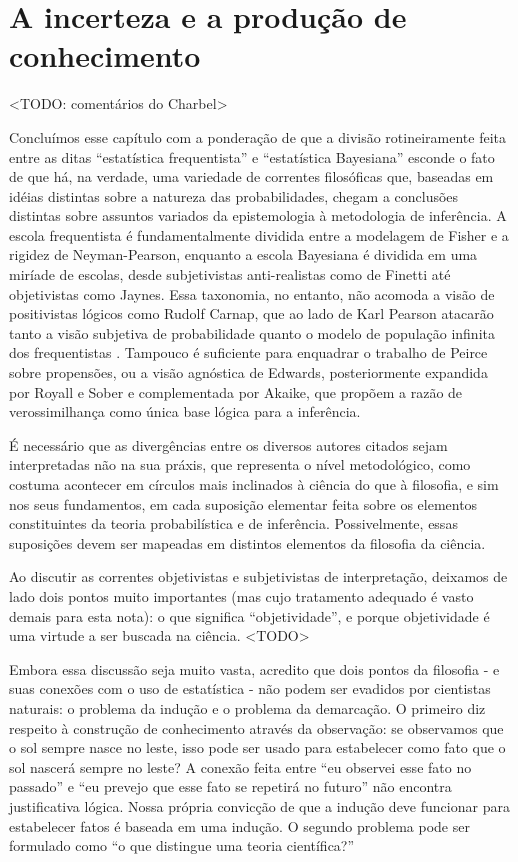 \section{A incerteza e a produção de conhecimento}\label{sec:ciencia} <TODO: comentários do Charbel>

Concluímos esse capítulo com a ponderação de que a divisão rotineiramente feita entre as ditas ``estatística
frequentista'' e 
``estatística Bayesiana'' esconde o fato de que há, na verdade, uma variedade de correntes filosóficas que, baseadas
em idéias distintas sobre a natureza das probabilidades, chegam a
conclusões distintas sobre assuntos variados da epistemologia 
à metodologia de inferência. A escola frequentista é fundamentalmente dividida entre a modelagem de Fisher e a
rigidez de
Neyman-Pearson, enquanto a escola Bayesiana é dividida em uma miríade de escolas, desde
subjetivistas anti-realistas como de Finetti até objetivistas como Jaynes.
Essa taxonomia, no entanto, não acomoda a visão de positivistas lógicos como Rudolf Carnap, que ao lado de Karl
Pearson atacarão tanto
a visão subjetiva de probabilidade quanto o modelo de população infinita dos frequentistas
\citep{Lenhard06, Zabell09}.
Tampouco é suficiente para enquadrar o trabalho de Peirce sobre propensões, ou a visão agnóstica de Edwards, 
posteriormente expandida por Royall e Sober e complementada por
Akaike, que propõem a razão de verossimilhança como única base lógica para a inferência.

É necessário que as divergências entre os diversos autores citados sejam interpretadas não na sua práxis, que
representa 
o nível metodológico, como costuma acontecer em círculos mais inclinados à ciência do que à filosofia, 
e sim nos seus fundamentos, em cada suposição elementar feita sobre os
elementos constituintes da teoria probabilística e de inferência. Possivelmente, essas suposições devem ser
mapeadas em
distintos elementos da filosofia da ciência.

Ao discutir as correntes objetivistas e subjetivistas de interpretação, deixamos de lado dois pontos muito
importantes (mas cujo tratamento adequado é vasto demais para esta nota): o que significa ``objetividade'', e
porque objetividade é uma virtude a ser buscada na ciência. <TODO>


Embora essa discussão seja muito vasta, acredito que dois pontos da filosofia - e suas conexões com o uso de
estatística -
não podem ser evadidos por cientistas naturais: o problema da indução e o problema da demarcação.
O primeiro diz respeito à construção de conhecimento através da observação: se observamos que o sol sempre nasce no leste,
isso pode ser usado para estabelecer como fato que o sol nascerá sempre no leste? A conexão feita entre ``eu observei esse
fato no passado'' e ``eu prevejo que esse fato se repetirá no futuro'' não encontra justificativa lógica. Nossa própria convicção
de que a indução deve funcionar para estabelecer fatos é baseada em uma indução. O segundo problema pode ser formulado como
``o que distingue uma teoria científica?'' %


